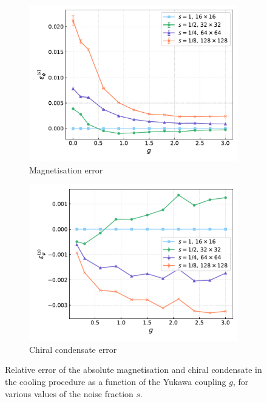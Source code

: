 \begin{figure}[htp]
    \centering
    \begin{subfigure}[b]{0.47\textwidth}
        \includegraphics[width=\textwidth]{figures/cooling/yukawa_scan/deviation.pdf}
        \caption{Magnetisation error}
    \end{subfigure}
    \begin{subfigure}[b]{0.47\textwidth}
        \includegraphics[width=\textwidth]{figures/cooling/yukawa_scan/deviation_cond.pdf}
        \caption{Chiral condensate error}
    \end{subfigure}
    \caption[Relative error in the cooling procedure at tree level as a function of the Yukawa coupling.]{Relative error of the absolute magnetisation and chiral condensate in the cooling procedure as a function of the Yukawa coupling $g$, for various values of the noise fraction $s$.}
    \label{fig:cooling_deviation_yukawa}
\end{figure} \\
